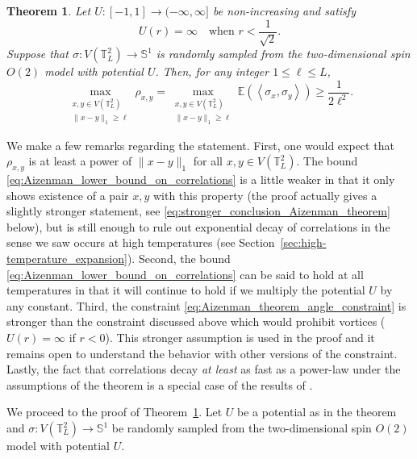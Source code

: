 \documentclass[12pt,reqno]{article}
\def\E{\mathbb{E}}
\def\T{\mathbb{T}}
\newtheorem{theorem}{Theorem}[section]
\begin{document}
\begin{theorem}\label{thm:Aizenman_lower_bound_on_correlations}
Let $U:[-1,1]\to(-\infty,\infty]$ be non-increasing and satisfy
\begin{equation}\label{eq:Aizenman_theorem_angle_constraint}
  U(r) = \infty\quad\text{when $r<\frac{1}{\sqrt{2}}$}.
\end{equation}
Suppose that $\sigma:V(\T_L^2)\to \mathbb S^1$ is
randomly sampled from the two-dimensional spin $O(2)$ model with
potential $U$. Then, for any integer $1\le \ell\le L$,
\begin{equation}\label{eq:Aizenman_lower_bound_on_correlations}
  \max_{\substack{x,y\in V(\T_L^2)\\\|x-y\|_1\ge \ell}} \rho_{x,y} = \max_{\substack{x,y\in V(\T_L^2)\\\|x-y\|_1\ge \ell}} \E(\left\langle\sigma_x,\sigma_y\right\rangle) \ge \frac{1}{2\ell^2}.
\end{equation}
\end{theorem}
We make a few remarks regarding the statement. First, one would
expect that $\rho_{x,y}$ is at least a power of $\|x-y\|_1$ for all
$x,y\in V(\T_L^2)$. The bound
\eqref{eq:Aizenman_lower_bound_on_correlations} is a little weaker
in that it only shows existence of a pair $x,y$ with this property
(the proof actually gives a slightly stronger statement, see \eqref{eq:stronger_conclusion_Aizenman_theorem}
below), but is still enough to rule out exponential decay of
correlations in the sense we saw occurs at high temperatures (see
Section~\ref{sec:high-temperature_expansion}). Second, the bound
\eqref{eq:Aizenman_lower_bound_on_correlations} can be said to hold
at all temperatures in that it will continue to hold if we multiply
the potential $U$ by any constant. Third, the constraint
\eqref{eq:Aizenman_theorem_angle_constraint} is stronger than the
constraint discussed above which would prohibit vortices
($U(r)=\infty$ if $r<0$). This stronger assumption is used in the
proof and it remains open to understand the behavior with other
versions of the constraint. Lastly, the fact that correlations decay \emph{at least} as fast as a power-law under the assumptions of the theorem is a special case of the results of \cite{Gagnebin2018}.

We proceed to the proof of Theorem~\ref{thm:Aizenman_lower_bound_on_correlations}. Let $U$ be a potential as in the theorem and $\sigma:V(\T_L^2)\to \mathbb S^1$ be
randomly sampled from the two-dimensional spin $O(2)$ model with potential $U$.
\end{document}
